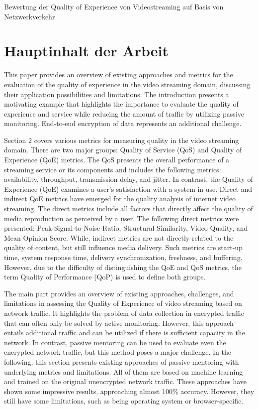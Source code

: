 \documentclass[a4paper,DIV=16]{scrartcl}
\begin{document}
Bewertung der Quality of Experience von Videostreaming auf Basis von Netzwerkverkehr


\section*{Hauptinhalt der Arbeit}

This paper provides an overview of existing approaches and metrics for the evaluation of the quality of experience in the video streaming domain, discussing their application possibilities and limitations. The introduction presents a motivating example that highlights the importance to evaluate the quality of experience and service while reducing the amount of traffic by utilizing passive monitoring. End-to-end encryption of data represents an additional challenge.

Section 2 covers various metrics for measuring quality in the video streaming domain. There are two major groups: Quality of Service (QoS) and Quality of Experience (QoE) metrics. The QoS presents the overall performance of a streaming service or its components and includes the following metrics: availability, throughput, transmission delay, and jitter. In contrast, the Quality of Experience (QoE) examines a user's satisfaction with a system in use. Direct and indirect QoE metrics have emerged for the quality analysis of internet video streaming. The direct metrics include all factors that directly affect the quality of media reproduction as perceived by a user. The following direct metrics were presented: Peak-Signal-to-Noise-Ratio, Structural Similarity, Video Quality, and Mean Opinion Score. While, indirect metrics are not directly related to the quality of content, but still influence media delivery. Such metrics are start-up time, system response time, delivery synchronization, freshness, and buffering. However, due to the difficulty of distinguishing the QoE and QoS metrics, the term Quality of Performance (QoP) is used to define both groups.

The main part provides an overview of existing approaches, challenges, and limitations in assessing the Quality of Experience of video streaming based on network traffic. It highlights the problem of data collection in encrypted traffic that can often only be solved by active monitoring. However, this approach entails additional traffic and can be utilized if there is sufficient capacity in the network. In contrast, passive mentoring can be used to evaluate even the encrypted network traffic, but this method poses a major challenge. In the following, this section presents existing approaches of passive mentoring with underlying metrics and limitations. All of them are based on machine learning and trained on the original unencrypted network traffic. These approaches have shown some impressive results, approaching almost 100\% accuracy. However, they still have some limitations, such as being operating system or browser-specific.
\end{document}
